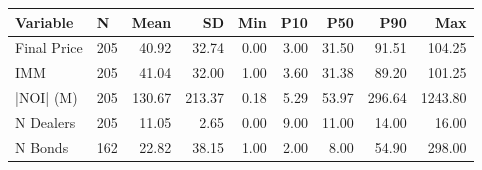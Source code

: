 \begin{tabular}{llrrrrrrr}
\toprule
   Variable &   N &   Mean &     SD &  Min &  P10 &   P50 &    P90 &     Max \\
\midrule
Final Price & 205 &  40.92 &  32.74 & 0.00 & 3.00 & 31.50 &  91.51 &  104.25 \\
        IMM & 205 &  41.04 &  32.00 & 1.00 & 3.60 & 31.38 &  89.20 &  101.25 \\
  |NOI| (M) & 205 & 130.67 & 213.37 & 0.18 & 5.29 & 53.97 & 296.64 & 1243.80 \\
  N Dealers & 205 &  11.05 &   2.65 & 0.00 & 9.00 & 11.00 &  14.00 &   16.00 \\
    N Bonds & 162 &  22.82 &  38.15 & 1.00 & 2.00 &  8.00 &  54.90 &  298.00 \\
\bottomrule
\end{tabular}
